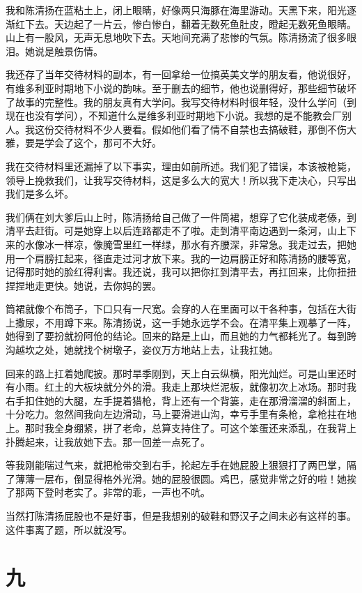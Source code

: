  我和陈清扬在蓝粘土上，闭上眼睛，好像两只海豚在海里游动。天黑下来，阳光逐渐红下去。天边起了一片云，惨白惨白，翻着无数死鱼肚皮，瞪起无数死鱼眼睛。山上有一股风，无声无息地吹下去。天地间充满了悲惨的气氛。陈清扬流了很多眼泪。她说是触景伤情。 
 
 我还存了当年交待材料的副本，有一回拿给一位搞英美文学的朋友看，他说很好，有维多利亚时期地下小说的韵味。至于删去的细节，他也说删得好，那些细节破坏了故事的完整性。我的朋友真有大学问。我写交待材料时很年轻，没什么学问（到现在也没有学问），不知道什么是维多利亚时期地下小说。我想的是不能教会厂别人。我这份交待材料不少人要看。假如他们看了情不自禁也去搞破鞋，那倒不伤大雅，要是学会了这个，那可不大好。 
 
 我在交待材料里还漏掉了以下事实，理由如前所述。我们犯了错误，本该被枪毙，领导上挽救我们，让我写交待材料，这是多么大的宽大！所以我下走决心，只写出我们是多么坏。 
 
 我们俩在刘大爹后山上时，陈清扬给自己做了一件筒裙，想穿了它化装成老傣，到清平去赶街。可是她穿上以后连路都走不了啦。走到清平南边遇到一条河，山上下来的水像冰一样凉，像腌雪里红一样绿，那水有齐腰深，非常急。我走过去，把她用一个肩膀扛起来，径直走过河才放下来。我的一边肩膀正好和陈清扬的腰等宽，记得那时她的脸红得利害。我还说，我可以把你扛到清平去，再扛回来，比你扭扭捏捏地走更快。她说，去你妈的罢。 
 
 筒裙就像个布筒子，下口只有一尺宽。会穿的人在里面可以干各种事，包括在大街上撒尿，不用蹲下来。陈清扬说，这一手她永远学不会。在清平集上观摹了一阵，她得到了要扮就扮阿伧的结论。回来的路是上山，而且她的力气都耗光了。每到跨沟越坎之处，她就找个树墩子，姿仪万方地站上去，让我扛她。 
 
 回来的路上扛着她爬披。那时旱季刚到，天上白云纵横，阳光灿烂。可是山里还时有小雨。红土的大板块就分外的滑。我走上那块烂泥板，就像初次上冰场。那时我右手扣住她的大腿，左手提着猎枪，背上还有一个背篓，走在那滑溜溜的斜面上，十分吃力。忽然间我向左边滑动，马上要滑进山沟，幸亏手里有条枪，拿枪拄在地上。那时我全身绷紧，拼了老命，总算支持住了。可这个笨蛋还来添乱，在我背上扑腾起来，让我放她下去。那一回差一点死了。 
 
 等我刚能喘过气来，就把枪带交到右手，抡起左手在她屁股上狠狠打了两巴掌，隔了薄薄一层布，倒显得格外光滑。她的屁股很圆。鸡巴，感觉非常之好的啦！她挨了那两下登时老实了。非常的乖，一声也不吭。 
 
 当然打陈清扬屁股也不是好事，但是我想别的破鞋和野汉子之间未必有这样的事。这件事离了题，所以就没写。 
 
 

\section{九} 
 
